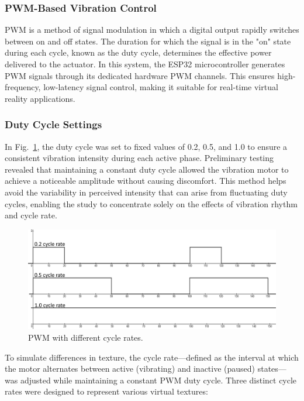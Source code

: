 \subsubsection{PWM-Based Vibration Control}
PWM is a method of signal modulation in which a digital output rapidly switches between on and off states. The duration for which the signal is in the "on" state during each cycle, known as the duty cycle, determines the effective power delivered to the actuator. In this system, the ESP32 microcontroller generates PWM signals through its dedicated hardware PWM channels. This ensures high-frequency, low-latency signal control, making it suitable for real-time virtual reality applications.

\newpage
\subsubsection{Duty Cycle Settings}
In Fig.~\ref{fig:pwm_3}, the duty cycle was set to fixed values of 0.2, 0.5, and 1.0 to ensure a consistent vibration intensity during each active phase. Preliminary testing revealed that maintaining a constant duty cycle allowed the vibration motor to achieve a noticeable amplitude without causing discomfort. This method helps avoid the variability in perceived intensity that can arise from fluctuating duty cycles, enabling the study to concentrate solely on the effects of vibration rhythm and cycle rate.

\begin{figure}[H]\centering
	\includegraphics[width=1\textwidth]{Pictures/PWM_3.png}%
	\caption{PWM with different cycle rates.}\label{fig:pwm_3}%
	
\end{figure}

To simulate differences in texture, the cycle rate—defined as the interval at which the motor alternates between active (vibrating) and inactive (paused) states—was adjusted while maintaining a constant PWM duty cycle. Three distinct cycle rates were designed to represent various virtual textures:

